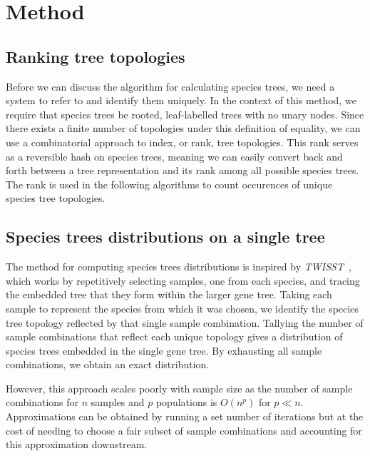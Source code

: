 \documentclass{article}
\newcommand{\twisst}{{\textit{TWISST}}}
\begin{document}
\section{Method}
\subsection{Ranking tree topologies}

Before we can discuss the algorithm for calculating species trees, we
need a system to refer to and identify them uniquely.
In the context of this method, we require that species trees be rooted,
leaf-labelled trees with no unary nodes.
Since there exists a finite number of topologies under this definition
of equality, we can use a combinatorial approach to index, or rank,
tree topologies.
This rank serves as a reversible hash on species trees, meaning we can
easily convert back and forth between a tree representation and its
rank among all possible species trees. The rank is used in the following
algorithms to count occurences of unique species tree topologies.

\subsection{Species trees distributions on a single tree}

The method for computing species trees distributions is inspired by
\twisst{}~\citep{Martin429}, which works
by repetitively selecting samples, one from each species, and tracing the
embedded tree that they form within the larger gene tree. Taking each
sample to represent the species from which it was chosen, we identify
the species tree topology reflected by that single sample combination.
Tallying the number of sample combinations that
reflect each unique topology gives a distribution of species trees
embedded in the single gene tree. By exhausting all sample combinations,
we obtain an exact distribution.

However, this approach scales poorly with sample size as the number
of sample combinations for $n$ samples and $p$ populations is $O(n^p)$ for
$p \ll n$. Approximations can be obtained by running a set number of iterations
but at the cost of needing to choose a fair subset of sample combinations and
accounting for this approximation downstream.
\end{document}
